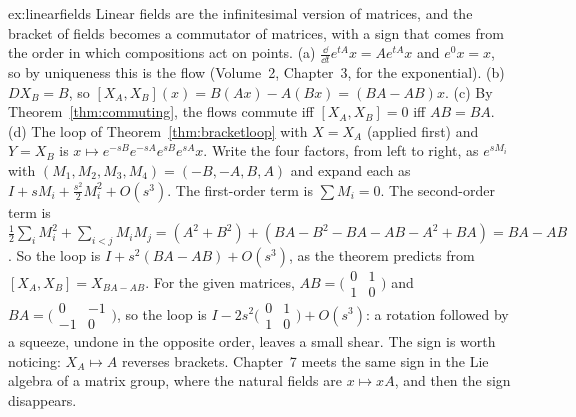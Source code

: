\begin{solution}{ex:linearfields}
\idea Linear fields are the infinitesimal version of matrices, and the bracket of fields becomes a commutator of matrices, with a sign that comes from the
order in which compositions act on points.
\writeup (a) $\frac{\dd}{\dd t}e^{tA}x=Ae^{tA}x$ and $e^{0}x=x$, so by uniqueness this is the flow (Volume~2, Chapter~3, for the exponential). (b) $DX_B=B$, so
$[X_A,X_B](x)=B(Ax)-A(Bx)=(BA-AB)x$. (c) By Theorem~\ref{thm:commuting}, the flows commute iff $[X_A,X_B]=0$ iff $AB=BA$. (d) The loop of Theorem~\ref{thm:bracketloop} with $X=X_A$ (applied first) and $Y=X_B$ is $x\mapsto e^{-sB}e^{-sA}e^{sB}e^{sA}x$. Write the four
factors, from left to right, as $e^{sM_i}$ with $(M_1,M_2,M_3,M_4)=(-B,-A,B,A)$ and expand each as $I+sM_i+\frac{s^2}2M_i^2+O(s^3)$. The first-order term
is $\sum M_i=0$. The second-order term is $\frac12\sum_iM_i^2+\sum_{i<j}M_iM_j=(A^2+B^2)+(BA-B^2-BA-AB-A^2+BA)=BA-AB$. So the loop is
$I+s^2(BA-AB)+O(s^3)$, as the theorem predicts from $[X_A,X_B]=X_{BA-AB}$. For the given matrices, $AB=\bigl(\begin{smallmatrix}0&1\\1&0\end{smallmatrix}\bigr)$ and
$BA=\bigl(\begin{smallmatrix}0&-1\\-1&0\end{smallmatrix}\bigr)$, so the loop is $I-2s^2\bigl(\begin{smallmatrix}0&1\\1&0\end{smallmatrix}\bigr)+O(s^3)$: a rotation followed by a squeeze,
undone in the opposite order, leaves a small shear. The sign is worth noticing: $X_A\mapsto A$ reverses brackets. Chapter~7 meets the same sign in the
Lie algebra of a matrix group, where the natural fields are $x\mapsto xA$, and then the sign disappears.
\end{solution}

